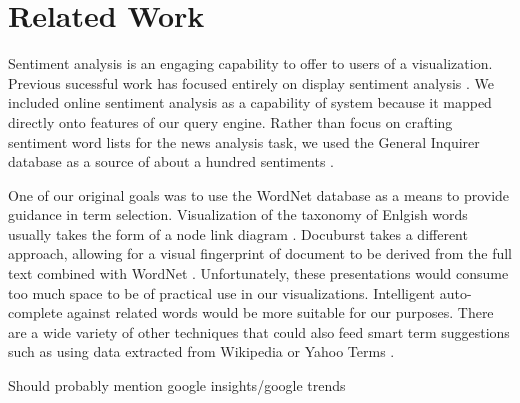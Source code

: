 \section{Related Work}

\cite{grobelnik2004visualization}
\cite{wermter2002selforganizing}
\cite{johnson2004network}
\cite{hearst1995tilebars}
\cite{mehler2006spatial}
\cite{paulovich2006text}



Sentiment analysis is an engaging capability to offer to users of a visualization.  Previous sucessful work has focused entirely on display sentiment analysis \cite{wanner2009visual}.  We included online sentiment analysis as a capability of system because it mapped directly onto features of our query engine.  Rather than focus on crafting sentiment word lists for the news analysis task, we used the General Inquirer database as a source of about a hundred sentiments \cite{generalinquirer}.

One of our original goals was to use the WordNet database as a means to provide guidance in term selection.  Visualization of the taxonomy of Enlgish words usually takes the form of a node link diagram \cite{collins2006wordnet,wordvis}.  Docuburst takes a different approach, allowing for a visual fingerprint of document to be derived from the full text combined with WordNet \cite{fellbaum2010wordnet}.  Unfortunately, these presentations would consume too much space to be of practical use in our visualizations.  Intelligent auto-complete against related words would be more suitable for our purposes.  There are a wide variety of other techniques that could also feed smart term suggestions such as using data extracted from Wikipedia or Yahoo Terms \cite{dakka2008automatic}.


Should probably mention google insights/google trends